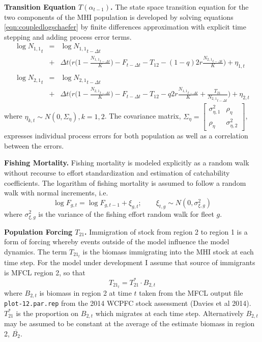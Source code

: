 \documentclass[12pt,letterpaper]{article}
\newcommand\help[1]{\color{Magenta}{\it #1 }\normalcolor}
\newcommand\widebar[1]{\overline{#1}}
\newcommand\None{{N_{1,1}}}
\newcommand\Ntwo{{N_{2,1}}}
\begin{document}
{\bf Transition Equation $T(\alpha_{t-1})$.}
The state space transition equation for the two components of the MHI
population is developed by solving
equations \ref{eqn:coupledlogschaefer} by finite differences
approximation with explicit time stepping and adding process error
terms.
\begin{eqnarray}
\log \None_t &=& \log \None_{t-\Delta t}\nonumber\\ 
             &+&\Delta t\bigg(r\Big(1-\frac{\None_{t-\Delta t}}{K}\Big)
-F_{t-\Delta t} - T_{12} - (1-q)2r\frac{\Ntwo_{t-\Delta
t}}{K}\bigg)+\eta_{1,t}\nonumber\\
\\ \log \Ntwo_t &=& \log \Ntwo_{t-\Delta t}\nonumber\\
             &+&\Delta t\bigg(r\Big(1-\frac{\Ntwo_{t-\Delta t}}{K}\Big)
-F_{t-\Delta t} - T_{12} - q2r\frac{\None_{t-\Delta t}}{K}
     +\frac{T_{21}}{\Ntwo_{t-\Delta t}}\bigg)+\eta_{2,t}\nonumber
\label{eqn:finitecoupledlogschaefer}
\end{eqnarray}
where $\eta_{k,t} \sim N(0,\Sigma_\eta),k=1,2$. The covariance matrix,
$\Sigma_\eta = \left[\begin{array}{cc}\sigma^2_{\eta,1}&\rho_\eta\\
                                     \rho_\eta&\sigma^2_{\eta,2}
\end{array}\right]$,
expresses individual process errors for both population as well as a
correlation between the errors.

{\bf Fishing Mortality.}
Fishing mortality is
modeled explicitly as a random walk
without recourse to effort standardization and
estimation of catchability coefficients. The logarithm of fishing
mortality is assumed to
follow a random walk with normal increments, i.e.
\begin{equation}
\log F_{g,t} = \log F_{g,t-1} + \xi_{g,t};\qquad \xi_{t,g}\sim
N(0,\sigma^2_{\xi,g}) \label{eqn:Fwalk}
\end{equation}
where  $\sigma^2_{\xi,g}$ is the variance of the fishing
effort random walk for fleet $g$.
\help{Distribution of increments?}

{\bf Population Forcing $T_{21}$.}
Immigration of stock from region 2 to region 1 is a
form of forcing whereby events outside of the model influence the
model dynamics. The term $T_{{21}_t}$ is the biomass immigrating
into the MHI stock at each time step. For the model under development
I assume that source of immigrants is MFCL region 2, so that
\begin{equation}
T_{{21}_t} = T^*_{21}\cdot B_{2,t}
\end{equation}
where $B_{2,t}$ is biomass in region 2 at time $t$ taken from the MFCL output file
{\tt plot-12.par.rep} from the 2014 WCPFC stock assessment
(Davies et al 2014). $T^*_{21}$ is the proportion on
$B_{2,t}$ which migrates at each time step.
Alternatively $B_{2,t}$ may be assumed to be constant at the average
of the estimate biomass in region 2, $\widebar{B_{2}}$.
\end{document}
